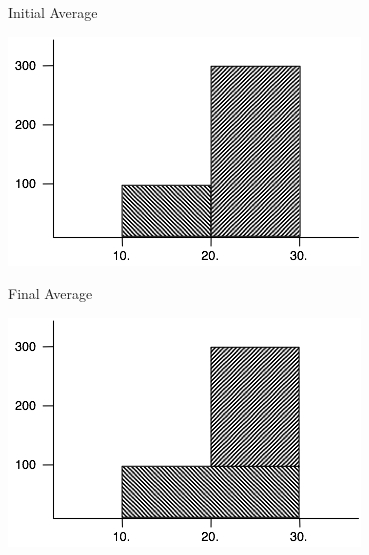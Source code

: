 \begin{frame}[fragile]{Initial Average}
\begin{center}
\includegraphics[width=.85 \paperwidth]{../workshopMaterial/initialAverage.jpg}
\end{center}
\end{frame}

\begin{frame}[fragile]{Final Average}
\begin{center}
\includegraphics[width=.85 \paperwidth]{../workshopMaterial/finalAverage.jpg}
\end{center}
\end{frame}


